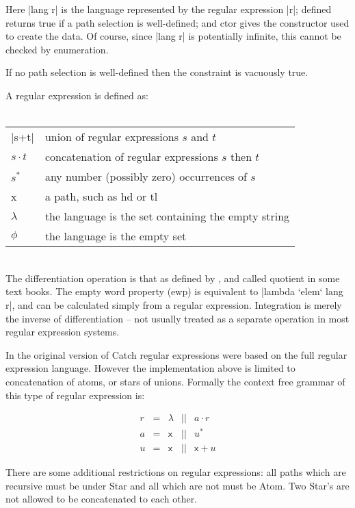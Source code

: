 \documentclass[preprint]{sigplanconf}
\newcommand{\C}[1]{\textsf{#1}}
\newcommand{\K}{\ensuremath{^\ast}} %
\newcommand{\D}{\ensuremath{\cdot}} %
\begin{document}
Here |lang r| is the language represented by the regular expression |r|; \C{defined} returns true if a path selection is well-defined; and \C{ctor} gives the constructor used to create the data. Of course, since |lang r| is potentially infinite, this cannot be checked by enumeration.

If no path selection is well-defined then the constraint is vacuously true.

A regular expression is defined as:\\ \\
\begin{tabular}{ll}
|s+t| & union of regular expressions $s$ and $t$ \\
$s\D t$ & concatenation of regular expressions $s$ then $t$ \\
$s\K$  & any number (possibly zero) occurrences of $s$ \\
\C{x} & a path, such as \C{hd} or \C{tl} \\
$\lambda$ & the language is the set containing the empty string \\
$\phi$ & the language is the empty set
\end{tabular} \\

The differentiation operation is that as defined by \citet{conway}, and called quotient in some text books. The empty word property (\C{ewp}) is equivalent to |lambda `elem` lang r|, and can be calculated simply from a regular expression. Integration is merely the inverse of differentiation -- not usually treated as a separate operation in most regular expression systems.

In the original version of Catch regular expressions were based on the full regular expression language. However the implementation above is limited to concatenation of atoms, or stars of unions. Formally the context free grammar of this type of regular expression is:

\[\begin{array}{lllll}
r & = & \lambda & || & a\D r \\
a & = & \C{x}   & || & u\K \\
u & = & \C{x}   & || & \C{x} + u
\end{array}\]

There are some additional restrictions on regular expressions: all paths which are recursive must be under \C{Star} and all which are not must be \C{Atom}. Two \C{Star}'s are not allowed to be concatenated to each other.
\end{document}
